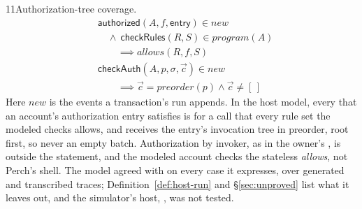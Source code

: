 \begin{perchstatement}{11}{Authorization-tree coverage.}\label{stmt:authorization-tree-coverage}
\[\begin{aligned}&\mathsf{authorized}(A, f, \mathsf{entry}) \in \mathit{new}\\
&\quad \land\ \mathsf{checkRules}(R, S) \in \mathit{program}(A)\\
&\qquad \implies \mathit{allows}(R, f, S)\\
&\mathsf{checkAuth}(A, p, \sigma, \vec c) \in \mathit{new}\\
&\qquad \implies \vec c = \mathit{preorder}(p) \land \vec c \neq [\,]\end{aligned}\]
Here $\mathit{new}$ is the events a transaction's run appends. In the host model, every  that an account's authorization entry satisfies is for a call that every rule set the modeled  checks allows, and  receives the entry's invocation tree in preorder, root first, so never an empty batch. Authorization by invoker, as in the owner's , is outside the statement, and the modeled account checks the stateless \textit{allows}, not Perch's shell. The model agreed with  on every case it expresses, over  generated and  transcribed traces; Definition~\ref{def:host-run} and \S\ref{sec:unproved} list what it leaves out, and the simulator's host, , was not tested.
\end{perchstatement}
